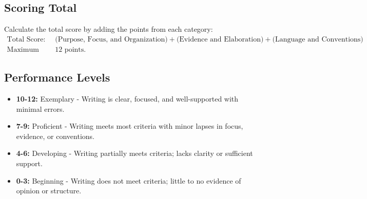 \documentclass[12pt]{article}
\begin{document}
\subsection*{Scoring Total}
Calculate the total score by adding the points from each category:
\begin{align*}
\text{Total Score: } & \text{(Purpose, Focus, and Organization)} + \text{(Evidence and Elaboration)} + \text{(Language and Conventions)} \\
\text{Maximum Score: } & 12 \text{ points.}
\end{align*}

\subsection*{Performance Levels}
\begin{itemize}
    \item \textbf{10-12:} Exemplary - Writing is clear, focused, and well-supported with minimal errors.
    \item \textbf{7-9:} Proficient - Writing meets most criteria with minor lapses in focus, evidence, or conventions.
    \item \textbf{4-6:} Developing - Writing partially meets criteria; lacks clarity or sufficient support.
    \item \textbf{0-3:} Beginning - Writing does not meet criteria; little to no evidence of opinion or structure.
\end{itemize}
\end{document}
